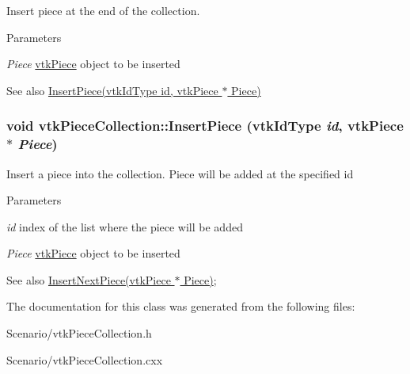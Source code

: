 Insert piece at the end of the collection. 
\begin{DoxyParams}{Parameters}
\item[{\em Piece}]\hyperlink{classvtkPiece}{vtkPiece} object to be inserted \end{DoxyParams}
\begin{DoxySeeAlso}{See also}
\hyperlink{classvtkPieceCollection_a8bd89cd54bd00572fbffc2c403e35cef}{InsertPiece(vtkIdType id, vtkPiece $\ast$ Piece)} 
\end{DoxySeeAlso}
\hypertarget{classvtkPieceCollection_a8bd89cd54bd00572fbffc2c403e35cef}{
\subsubsection[{InsertPiece}]{\setlength{\rightskip}{0pt plus 5cm}void vtkPieceCollection::InsertPiece (vtkIdType {\em id}, \/  {\bf vtkPiece} $\ast$ {\em Piece})}}
\label{classvtkPieceCollection_a8bd89cd54bd00572fbffc2c403e35cef}


Insert a piece into the collection. Piece will be added at the specified id 
\begin{DoxyParams}{Parameters}
\item[{\em id}]index of the list where the piece will be added \item[{\em Piece}]\hyperlink{classvtkPiece}{vtkPiece} object to be inserted \end{DoxyParams}
\begin{DoxySeeAlso}{See also}
\hyperlink{classvtkPieceCollection_a6f37b0535d1a952beaa969000f857f24}{InsertNextPiece(vtkPiece $\ast$ Piece)}; 
\end{DoxySeeAlso}


The documentation for this class was generated from the following files:\begin{DoxyCompactItemize}
\item 
Scenario/vtkPieceCollection.h\item 
Scenario/vtkPieceCollection.cxx\end{DoxyCompactItemize}

